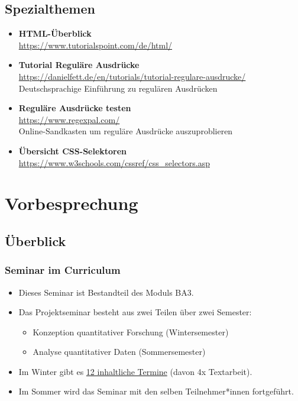 \documentclass[
  ngerman,
]{article}
\providecommand{\tightlist}{%
  \setlength{\itemsep}{0pt}\setlength{\parskip}{0pt}}
\begin{document}
\hypertarget{spezialthemen}{%
\subsection*{Spezialthemen}\label{spezialthemen}}

\begin{itemize}
\item
  \textbf{HTML-Überblick}\\
  \url{https://www.tutorialspoint.com/de/html/}
\item
  \textbf{Tutorial Reguläre Ausdrücke}\\
  \url{https://danielfett.de/en/tutorials/tutorial-regulare-ausdrucke/}~\\
  Deutschsprachige Einführung zu regulären Ausdrücken
\item
  \textbf{Reguläre Ausdrücke testen}\\
  \url{https://www.regexpal.com/}~\\
  Online-Sandkasten um reguläre Ausdrücke auszuproblieren
\item
  \textbf{Übersicht CSS-Selektoren}\\
  \url{https://www.w3schools.com/cssref/css_selectors.asp}
\end{itemize}

\hypertarget{vorbesprechung}{%
\section{Vorbesprechung}\label{vorbesprechung}}

\hypertarget{uxfcberblick}{%
\subsection{Überblick}\label{uxfcberblick}}

\hypertarget{seminar-im-curriculum}{%
\subsubsection{Seminar im Curriculum}\label{seminar-im-curriculum}}

\begin{itemize}
\tightlist
\item
  Dieses Seminar ist Bestandteil des Moduls BA3.
\item
  Das Projektseminar besteht aus zwei Teilen über zwei Semester:

  \begin{itemize}
  \tightlist
  \item
    Konzeption quantitativer Forschung (Wintersemester)
  \item
    Analyse quantitativer Daten (Sommersemester)
  \end{itemize}
\item
  Im Winter gibt es \protect\hyperlink{terminuxfcberblick}{12 inhaltliche Termine} (davon 4x Textarbeit).
\item
  Im Sommer wird das Seminar mit den selben Teilnehmer*innen fortgeführt.
\end{itemize}
\end{document}
